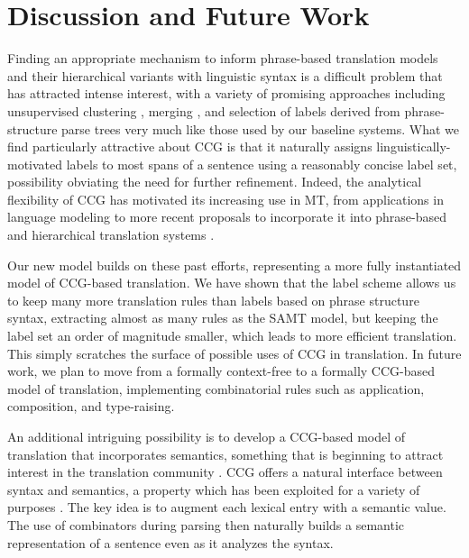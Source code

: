 \documentclass[a4paper]{article}
\begin{document}
\section{Discussion and Future Work}

Finding an appropriate mechanism to inform phrase-based translation models and their hierarchical variants with linguistic
syntax is a difficult problem that has attracted intense interest, with a variety of promising approaches including
unsupervised clustering \cite{zollmann+vogel:2011:acl}, merging \cite{hanneman+etal:2011}, and selection \cite{mylonakis+simaan:2011:acl}
of labels derived from phrase-structure parse trees very much like those used by our baseline systems. What we find
particularly attractive about CCG is that it naturally assigns linguistically-motivated labels to most spans of a
sentence using a reasonably concise label set, possibility obviating the need for further refinement. Indeed, the 
analytical flexibility of CCG has motivated its increasing use in MT, from applications in language modeling
\cite{birch+etal:2007:wmt,hassan+etal:2007:acl} to more recent proposals to incorporate it into phrase-based
\cite{mehay:2010:proposal} and hierarchical translation systems \cite{auli:2009:first-year}. 

Our new model builds on these past efforts, representing a more fully instantiated model of CCG-based
translation. We have shown that the label scheme allows us to keep many more translation rules than labels based on phrase 
structure syntax, extracting almost as many rules as the SAMT model, but keeping the label set an order of
magnitude smaller, which leads to more efficient translation. This simply scratches the surface of possible
uses of CCG in translation. In future work, we plan to move from a formally context-free to a formally CCG-based
model of translation, implementing combinatorial rules such as application, composition, and type-raising. 

An additional intriguing possibility is to develop a CCG-based model of translation that incorporates semantics,
something that is beginning to attract interest in the translation community \cite{wu+fung:2009:naacl}.
CCG offers a natural interface between syntax and semantics, a property which has been exploited for
a variety of purposes \cite{bos+etal:2004:coling,white+baldridge:2003:enlg,zettlemoyer+collins:2005:uai}.
The key idea is to augment each lexical entry with a semantic value. The use of combinators during parsing then 
naturally builds a semantic representation of a sentence even as it analyzes the syntax.
\end{document}
